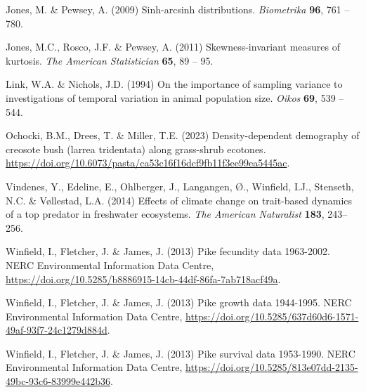 \documentclass[12pt]{article}
\begin{document}
\begin{spacing}{1.35}
\begin{thebibliography}{62}
Jones, M. \& Pewsey, A. (2009) Sinh-arcsinh distributions. \emph{Biometrika}
  \textbf{96}, 761 -- 780.

Jones, M.C., Rosco, J.F. \& Pewsey, A. (2011) Skewness-invariant measures of
  kurtosis. \emph{The American Statistician} \textbf{65}, 89 -- 95.

Link, W.A. \& Nichols, J.D. (1994) On the importance of sampling variance to
  investigations of temporal variation in animal population size. \emph{Oikos}
  \textbf{69}, 539 -- 544.

Ochocki, B.M., Drees, T. \& Miller, T.E. (2023) Density-dependent demography of
  creosote bush (larrea tridentata) along grass-shrub ecotones.
  \url{https://doi.org/10.6073/pasta/ca53c16f16dcf9fb11f3ee99ea5445ac}.

Vindenes, Y., Edeline, E., Ohlberger, J., Langangen, {\O}., Winfield, I.J.,
  Stenseth, N.C. \& V{\o}llestad, L.A. (2014) Effects of climate change on
  trait-based dynamics of a top predator in freshwater ecosystems. \emph{The
  American Naturalist} \textbf{183}, 243--256.

Winfield, I., Fletcher, J. \& James, J. (2013{}) Pike fecundity
  data 1963-2002. NERC Environmental Information Data Centre,
  \url{https://doi.org/10.5285/b8886915-14cb-44df-86fa-7ab718acf49a}.

Winfield, I., Fletcher, J. \& James, J. (2013{}) Pike growth data
  1944-1995. NERC Environmental Information Data Centre, \url{
  https://doi.org/10.5285/637d60d6-1571-49af-93f7-24c1279d884d}.

Winfield, I., Fletcher, J. \& James, J. (2013{}) Pike survival data
  1953-1990. NERC Environmental Information Data Centre,
  \url{https://doi.org/10.5285/813e07dd-2135-49bc-93c6-83999e442b36}.

\end{thebibliography}









\end{spacing}
\end{document}
